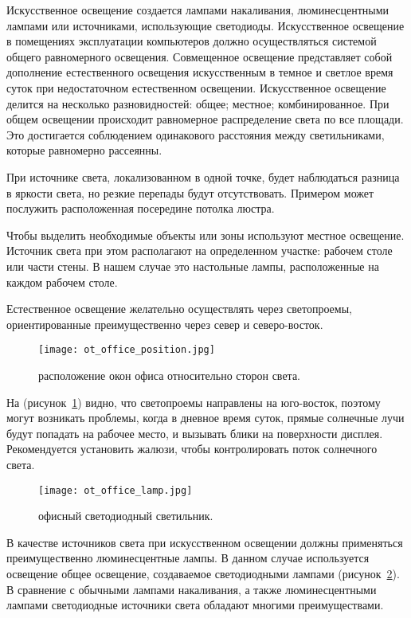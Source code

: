 Искусственное освещение создается лампами накаливания, люминесцентными лампами или источниками, использующие светодиоды.
Искусственное освещение в помещениях эксплуатации компьютеров должно осуществляться системой общего равномерного освещения.
Совмещенное освещение представляет собой дополнение естественного освещения искусственным в темное и светлое время суток при недостаточном естественном освещении.
Искусственное освещение делится на несколько разновидностей: общее; местное; комбинированное.
При общем освещении происходит равномерное распределение света по все площади.
Это достигается соблюдением одинакового расстояния между светильниками, которые равномерно рассеянны.

При источнике света, локализованном в одной точке, будет наблюдаться разница в яркости света, но резкие перепады будут отсутствовать.
Примером может послужить расположенная посередине потолка люстра.

Чтобы выделить необходимые объекты или зоны используют местное освещение.
Источник света при этом располагают на определенном участке: рабочем столе или части стены.
В нашем случае это настольные лампы, расположенные на каждом рабочем столе.

Естественное освещение желательно осуществлять через светопроемы, ориентированные преимущественно через север и северо-восток.

\begin{figure}[ht]
\centering
  \texttt{[image: ot\_office\_position.jpg]}
  \caption{ расположение окон офиса относительно сторон света. }
  \label{fig:office_position}
\end{figure}

На (рисунок~\ref{fig:office_position}) видно, что светопроемы направлены на юго-восток, поэтому могут возникать проблемы, когда в дневное время суток, прямые солнечные лучи будут попадать на рабочее место, и вызывать блики на поверхности дисплея.
Рекомендуется установить жалюзи, чтобы контролировать поток солнечного света.

\begin{figure}[ht]
\centering
  \texttt{[image: ot\_office\_lamp.jpg]}
  \caption{ офисный светодиодный светильник. }
  \label{fig:office_lamp}
\end{figure}

В качестве источников света при искусственном освещении должны применяться преимущественно люминесцентные лампы.
В данном случае используется освещение общее освещение, создаваемое светодиодными лампами (рисунок~\ref{fig:office_lamp}).
В сравнение с обычными лампами накаливания, а также люминесцентными лампами светодиодные источники света обладают многими преимуществами.

